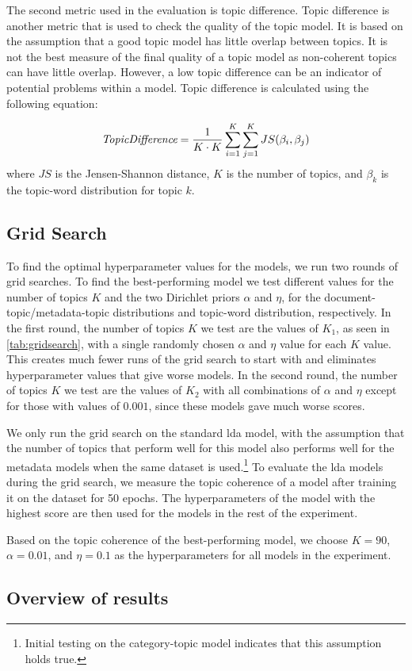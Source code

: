 The second metric used in the evaluation is topic difference.
Topic difference is another metric that is used to check the quality of the topic model.
It is based on the assumption that a good topic model has little overlap between topics.
It is not the best measure of the final quality of a topic model as non-coherent topics can have little overlap.
However, a low topic difference can be an indicator of potential problems within a model.
Topic difference is calculated using the following equation:

\begin{equation}
	\emph{TopicDifference} = \frac{1}{K \cdot K} \sum_{i=1}^{K} \sum_{j=1}^{K} JS(\beta_{i},\beta_{j})
\end{equation}
\noindent where $JS$ is the Jensen-Shannon distance, $K$ is the number of topics, and $\beta_{k}$ is the topic-word distribution for topic $k$.

\subsection{Grid Search}\label{sec:experiment_gridsearch}
To find the optimal hyperparameter values for the models, we run two rounds of grid searches.
To find the best-performing model we test different values for the number of topics $K$ and the two Dirichlet priors $\alpha$ and $\eta$, for the document-topic/metadata-topic distributions and topic-word distribution, respectively.
In the first round, the number of topics $K$ we test are the values of $K_1$, as seen in \autoref{tab:gridsearch}, with a single randomly chosen $\alpha$ and $\eta$ value for each $K$ value.
This creates much fewer runs of the grid search to start with and eliminates hyperparameter values that give worse models.
In the second round, the number of topics $K$ we test are the values of $K_2$ with all combinations of $\alpha$ and $\eta$ except for those with values of $0.001$, since these models gave much worse scores.

We only run the grid search on the standard \gls{lda} model, with the assumption that the number of topics that perform well for this model also performs well for the metadata models when the same dataset is used.\footnote{Initial testing on the category-topic model indicates that this assumption holds true.}
To evaluate the \gls{lda} models during the grid search, we measure the topic coherence of a model after training it on the dataset for 50 epochs.
The hyperparameters of the model with the highest score are then used for the models in the rest of the experiment.

Based on the topic coherence of the best-performing model, we choose $K = 90$, $\alpha = 0.01$, and $\eta = 0.1$ as the hyperparameters for all models in the experiment.



\subsection{Overview of results}\label{sec:results}


